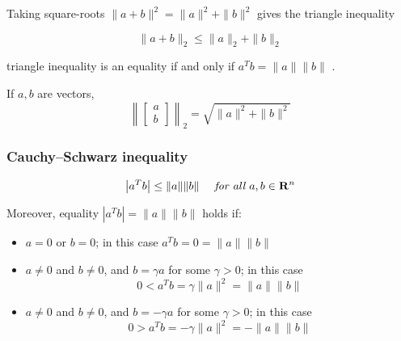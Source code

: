\begin{corollary}
    Taking square-roots $ \|a+b\|^{2}=\|a\|^{2}+\|b\|^{2} $ gives the triangle inequality

    \begin{equation}\| a + b \|_2 \le \|a \|_2 + \|b \|_2 \end{equation}

triangle inequality is an equality if and only if $ a^{T} b=\|a\|\|b\| $ .
\end{corollary}

\begin{corollary}
    If $ a, b $ are vectors,
\begin{equation}
\left\|\left[\begin{array}{l}
a \\
b
\end{array}\right]\right\|_2 =\sqrt{\|a\|^{2}+\|b\|^{2}}
\end{equation}
\end{corollary}

\subsubsection{Cauchy–Schwarz inequality}

\begin{theorem}
    \begin{equation} \left|a^{T} b\right| \leq\|a\|\|b\| \quad \term{ for all } a, b \in \mathbf{R}^{n} \end{equation}
\end{theorem}

\begin{corollary}
    Moreover, equality $ \left|a^{T} b\right|=\|a\|\|b\| $ holds if:

\begin{itemize}
    \item $ a=0 $ or $ b=0 $; in this case $ a^{T} b=0=\|a\|\|b\| $
    \item $ a \neq 0 $ and $ b \neq 0 $, and $ b=\gamma a $ for some $ \gamma>0 $; in this case
    \begin{equation}
    0<a^{T} b=\gamma\|a\|^{2}=\|a\|\|b\|
    \end{equation}

    \item $ a \neq 0 $ and $ b \neq 0 $, and $ b=-\gamma a $ for some $ \gamma>0 $; in this case
    \begin{equation}
    0>a^{T} b=-\gamma\|a\|^{2}=-\|a\|\|b\|
    \end{equation}
\end{itemize}
\end{corollary}

